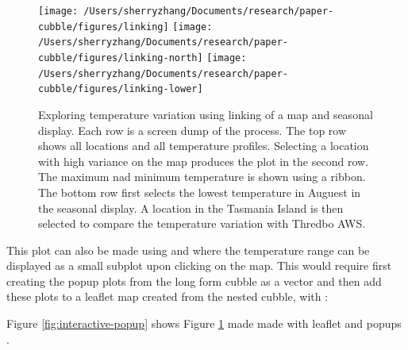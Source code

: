 \documentclass[
]{jss}
\begin{document}
\begin{CodeChunk}
\begin{figure}

{\centering \texttt{[image: /Users/sherryzhang/Documents/research/paper-cubble/figures/linking]} \texttt{[image: /Users/sherryzhang/Documents/research/paper-cubble/figures/linking-north]} \texttt{[image: /Users/sherryzhang/Documents/research/paper-cubble/figures/linking-lower]} 

}

\caption[Exploring temperature variation using linking of a map and seasonal display]{Exploring temperature variation using linking of a map and seasonal display. Each row is a screen dump of the process. The top row shows all locations and all temperature profiles. Selecting a location with high variance on the map produces the plot in the second row. The maximum nad minimum temperature is shown using a ribbon. The bottom row first selects the lowest temperature in Auguest in the seasonal display. A location in the Tasmania Island is then selected to compare the temperature variation with Thredbo AWS.}\label{fig:interactive-linking}
\end{figure}
\end{CodeChunk}

This plot can also be made using  and  where
the temperature range can be displayed as a small subplot upon clicking
on the map. This would require first creating the popup plots from the
long form cubble as a vector and then add these plots to a leaflet map
created from the nested cubble, with :

\begin{CodeChunk}
\end{CodeChunk}

Figure \ref{fig:interactive-popup} shows Figure
\ref{fig:interactive-linking} made made with leaflet and popups
\citep{leafpop}.
\end{document}
